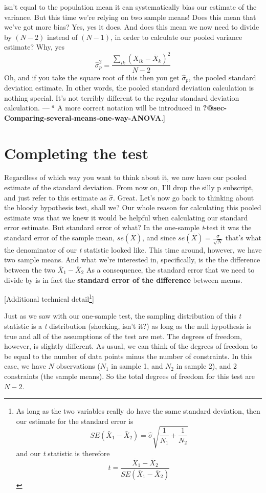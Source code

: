 \documentclass[
  a4paper,
]{book}
\begin{document}
{  isn't equal to the population mean it can systematically bias our
  estimate of the variance. But this time we're relying on two sample
  means! Does this mean that we've got more bias? Yes, yes it does. And
  does this mean we now need to divide by \((N - 2)\) instead of
  \((N - 1)\), in order to calculate our pooled variance estimate? Why,
  yes \[\hat {\sigma}_p^2=\frac{\sum_{ik}(X_{ik}-\bar{X}_k)^2}{N-2}\]
  Oh, and if you take the square root of this then you get
  \(\hat{\sigma}_p\), the pooled standard deviation estimate. In other
  words, the pooled standard deviation calculation is nothing special.
  It's not terribly different to the regular standard deviation
  calculation. --- \(^a\) A more correct notation will be introduced in
  \textbf{?@sec-Comparing-several-means-one-way-ANOVA}.}{]}

\hypertarget{completing-the-test}{%
\section{Completing the test}\label{completing-the-test}}

Regardless of which way you want to think about it, we now have our
pooled estimate of the standard deviation. From now on, I'll drop the
silly p subscript, and just refer to this estimate as \(\hat{\sigma}\).
Great. Let's now go back to thinking about the bloody hypothesis test,
shall we? Our whole reason for calculating this pooled estimate was that
we knew it would be helpful when calculating our standard error
estimate. But standard error of what? In the one-sample \emph{t}-test it
was the standard error of the sample mean, \(se(\bar{X})\), and since
\(se(\bar{X}) = \frac{\sigma}{\sqrt{N}}\) that's what the denominator of
our \emph{t} statistic looked like. This time around, however, we have
two sample means. And what we're interested in, specifically, is the the
difference between the two \(\bar{X}_1-\bar{X}_2\) As a consequence, the
standard error that we need to divide by is in fact the \textbf{standard
error of the difference} between means.

{[}Additional technical detail\footnote{As long as the two variables
  really do have the same standard deviation, then our estimate for the
  standard error is
  \[SE(\bar{X}_1-\bar{X}_2)=\hat{\sigma}\sqrt{\frac{1}{N_1}+\frac{1}{N_2}}\]
  and our \emph{t} statistic is therefore
  \[t=\frac{\bar{X}_1-\bar{X}_2}{SE(\bar{X}_1-\bar{X}_2)}\]}{]}

Just as we saw with our one-sample test, the sampling distribution of
this \emph{t} statistic is a \emph{t} distribution (shocking, isn't it?)
as long as the null hypothesis is true and all of the assumptions of the
test are met. The degrees of freedom, however, is slightly different. As
usual, we can think of the degrees of freedom to be equal to the number
of data points minus the number of constraints. In this case, we have
\(N\) observations (\(N_1\) in sample 1, and \(N_2\) in sample 2), and 2
constraints (the sample means). So the total degrees of freedom for this
test are \(N - 2\).
\end{document}
